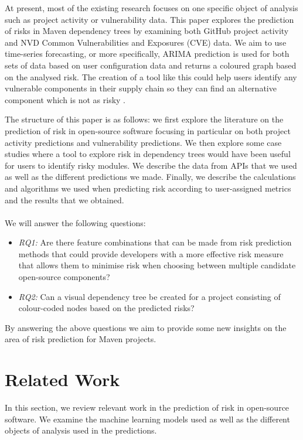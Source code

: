 \documentclass[conference]{IEEEtran}
\begin{document}
At present, most of the existing research focuses on one specific object of analysis such as project activity or vulnerability data. This paper explores the prediction of risks in Maven dependency trees by examining both GitHub project activity and NVD Common Vulnerabilities and Exposures (CVE) data. We aim to use time-series forecasting, or more specifically, ARIMA prediction is used for both sets of data based on user configuration data and returns a coloured graph based on the analysed risk. The creation of a tool like this could help users identify any vulnerable components in their supply chain so they can find an alternative component which is not as risky \cite{noauthor_open_nodate}. 

The structure of this paper is as follows: we first explore the literature on the prediction of risk in open-source software focusing in particular on both project activity predictions and vulnerability predictions. We then explore some case studies where a tool to explore risk in dependency trees would have been useful for users to identify risky modules. We describe the data from APIs that we used as well as the different predictions we made. Finally, we describe the calculations and algorithms we used when predicting risk according to user-assigned metrics and the results that we obtained. 
\\\\
We will answer the following questions:\\

\begin{itemize}
    \item \textit{RQ1:} Are there feature combinations that can be made from risk prediction methods that could provide developers with a more effective risk measure that allows them to minimise risk when choosing between multiple candidate open-source components?\\
    \item \textit{RQ2:} Can a visual dependency tree be created for a project consisting of colour-coded nodes based on the predicted risks?\\
\end{itemize}

By answering the above questions we aim to provide some new insights on the area of risk prediction for Maven projects. 

\section{Related Work}
In this section, we review relevant work in the prediction of risk in open-source software. We examine the machine learning models used as well as the different objects of analysis used in the predictions.  
\end{document}
